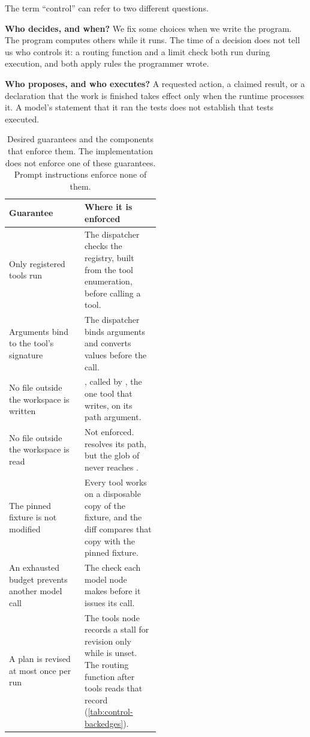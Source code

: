 The term ``control'' can refer to two different questions.

\bi

\item \textbf{Who decides, and when?} We fix some choices when we write the program. The program
computes others while it runs. The time of a decision does not tell us who controls it: a routing
function and a limit check both run during execution, and both apply rules the programmer wrote.

\item \textbf{Who proposes, and who executes?} A requested action, a claimed result, or a
declaration that the work is finished takes effect only when the runtime processes it. A model's
statement that it ran the tests does not establish that tests executed.

\ei

\begin{table}[htbp]
  \centering
  \begin{adjustbox}{width=\linewidth}\begin{tabularx}{\linewidth}{@{}XL{0.5\linewidth}@{}}
    \toprule
    \textbf{Guarantee} & \textbf{Where it is enforced} \\
    \midrule
    Only registered tools run & The dispatcher checks the registry, built from the tool
      enumeration, before calling a tool. \\
    Arguments bind to the tool's signature & The dispatcher binds arguments and converts values
      before the call. \\
    No file outside the workspace is written & , called by
      , the one tool that writes, on its path argument. \\
    No file outside the workspace is read & Not enforced.  resolves its path,
      but the glob of  never reaches . \\
    The pinned fixture is not modified & Every tool works on a disposable copy of the fixture, and
      the diff compares that copy with the pinned fixture. \\
    An exhausted budget prevents another model call & The check each model node makes before it
      issues its call. \\
    A plan is revised at most once per run & The tools node records a stall for revision only while
       is unset. The routing function after tools reads that record
      (\cref{tab:control-backedges}). \\
    \bottomrule
  \end{tabularx}\end{adjustbox}
  \caption{Desired guarantees and the components that enforce them. The implementation does not
  enforce one of these guarantees. Prompt instructions enforce none of them.}
  \label{tab:boundary-authority}
\end{table}

